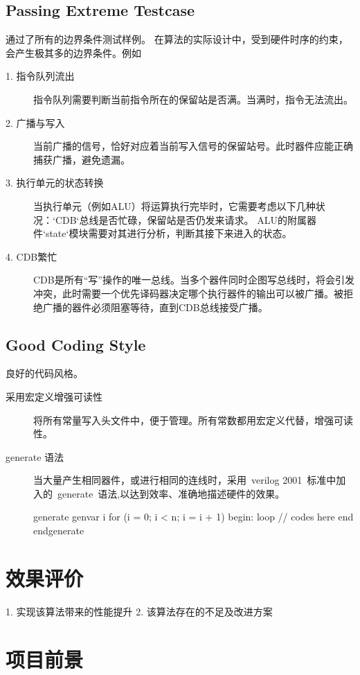\documentclass[twoside]{article}
\begin{document}
\subsection{Passing Extreme Testcase} 
通过了所有的边界条件测试样例。  
在算法的实际设计中，受到硬件时序的约束，会产生极其多的边界条件。例如
\begin{description}
	\item[1. 指令队列流出]指令队列需要判断当前指令所在的保留站是否满。当满时，指令无法流出。
	\item[2. 广播与写入]当前广播的信号，恰好对应着当前写入信号的保留站号。此时器件应能正确捕获广播，避免遗漏。
	\item[3. 执行单元的状态转换]当执行单元（例如ALU）将运算执行完毕时，它需要考虑以下几种状况：`CDB`总线是否忙碌，保留站是否仍发来请求。  
	ALU的附属器件`state`模块需要对其进行分析，判断其接下来进入的状态。
	\item[4. CDB繁忙]CDB是所有“写”操作的唯一总线。当多个器件同时企图写总线时，将会引发冲突，此时需要一个优先译码器决定哪个执行器件的输出可以被广播。被拒绝广播的器件必须阻塞等待，直到CDB总线接受广播。
\end{description}

\subsection{Good Coding Style}
良好的代码风格。  
\begin{description}
	\item[采用宏定义增强可读性]将所有常量写入头文件中，便于管理。所有常数都用宏定义代替，增强可读性。
	\item[generate 语法]当大量产生相同器件，或进行相同的连线时，采用~verilog 2001~标准中加入的~generate~语法,以达到效率、准确地描述硬件的效果。
    \begin{verilogcode}
        generate
            genvar i
            for (i = 0; i < n; i = i + 1) begin: loop
                // codes here
            end
        endgenerate
    \end{verilogcode}
\end{description}

\section{效果评价}

1. 实现该算法带来的性能提升
2. 该算法存在的不足及改进方案

\section{项目前景}




\end{document}
